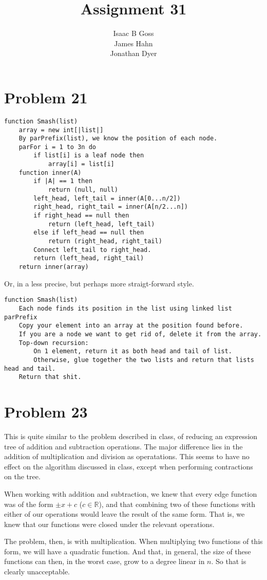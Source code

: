 \documentclass{article}
\author{Isaac B Goss\\ James Hahn\\ Jonathan Dyer}
\title{Assignment 31}
\providecommand{\prob}[1]{\section*{Problem #1}}
\providecommand{\R}{\mathbb{R}}
\begin{document}
\maketitle

\prob{21}

\begin{lstlisting}
function Smash(list)
    array = new int[|list|]
    By parPrefix(list), we know the position of each node.
    parFor i = 1 to 3n do
        if list[i] is a leaf node then
            array[i] = list[i]
    function inner(A)
        if |A| == 1 then
            return (null, null)
        left_head, left_tail = inner(A[0...n/2])
        right_head, right_tail = inner(A[n/2...n])
        if right_head == null then
            return (left_head, left_tail)
        else if left_head == null then
            return (right_head, right_tail)
        Connect left_tail to right_head.
        return (left_head, right_tail)
    return inner(array)
\end{lstlisting}

Or, in a less precise, but perhaps more straigt-forward style.

\begin{lstlisting}
function Smash(list)
    Each node finds its position in the list using linked list parPrefix
    Copy your element into an array at the position found before.
    If you are a node we want to get rid of, delete it from the array.
    Top-down recursion:
        On 1 element, return it as both head and tail of list.
        Otherwise, glue together the two lists and return that lists head and tail.
    Return that shit.
\end{lstlisting}

\prob{23}
This is quite similar to the problem described in class, of reducing an expression tree of addition and subtraction operations.
The major difference lies in the addition of multiplication and division as operatations.
This seems to have no effect on the algorithm discussed in class, except when performing contractions on the tree.

When working with addition and subtraction, we knew that every edge function was of the form $\pm x + c$ ($c \in \R$), and that combining two of these functions with either of our operations would leave the result of the same form.
That is, we knew that our functions were closed under the relevant operations.

The problem, then, is with multiplication.
When multiplying two functions of this form, we will have a quadratic function.
And that, in general, the size of these functions can then, in the worst case, grow to a degree linear in $n$.
So that is clearly unacceptable.
\end{document}
